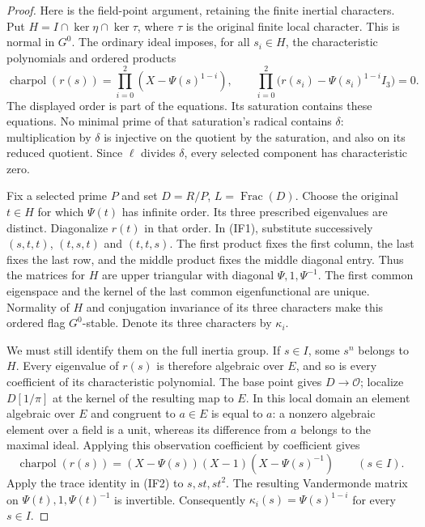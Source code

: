 \begin{proof}
Here is the field-point argument, retaining the finite inertial
characters.  Put $H=I\cap\ker\eta\cap\ker\tau$, where $\tau$ is the
original finite local character.  This is normal in $G^0$.  The ordinary
ideal imposes, for all $s_i\in H$, the characteristic polynomials and
ordered products
\[
 \operatorname{charpol}(r(s))=
       \prod_{i=0}^2(X-\Psi(s)^{1-i}),\qquad
 \prod_{i=0}^2\bigl(r(s_i)-\Psi(s_i)^{1-i}I_3\bigr)=0.
                                                               \tag{IF1}
\]
The displayed order is part of the equations.  Its saturation contains
these equations.  No minimal prime of that saturation's radical
contains $\delta$: multiplication by $\delta$ is injective on the
quotient by the saturation, and also on its reduced quotient.
Since $\ell$ divides $\delta$, every selected component has
characteristic zero.

Fix a selected prime $P$ and set $D=R/P$, $L=\operatorname{Frac}(D)$.
Choose the original $t\in H$ for which $\Psi(t)$ has infinite order.
Its three prescribed eigenvalues are distinct.  Diagonalize $r(t)$ in
that order.  In (IF1), substitute successively $(s,t,t)$, $(t,s,t)$ and
$(t,t,s)$.  The first product fixes the first column, the last fixes
the last row, and the middle product fixes the middle diagonal entry.
Thus the matrices for $H$ are upper triangular with diagonal
$\Psi,1,\Psi^{-1}$.  The first common eigenspace and the kernel of the
last common eigenfunctional are unique.  Normality of $H$ and
conjugation invariance of its three characters make this ordered flag
$G^0$-stable.  Denote its three characters by $\kappa_i$.

We must still identify them on the full inertia group.  If $s\in I$,
some $s^n$ belongs to $H$.  Every eigenvalue of $r(s)$ is therefore
algebraic over $E$, and so is every coefficient of its characteristic
polynomial.  The base point gives $D\to\mathcal O$; localize
$D[1/\pi]$ at the kernel of the resulting map to $E$.  In this local
domain an element algebraic over $E$ and congruent to $a\in E$ is
equal to $a$: a nonzero algebraic element over a field is a unit,
whereas its difference from $a$ belongs to the maximal ideal.
Applying this observation coefficient by coefficient gives
\[
 \operatorname{charpol}(r(s))=
          (X-\Psi(s))(X-1)(X-\Psi(s)^{-1})\qquad(s\in I).
                                                               \tag{IF2}
\]
Apply the trace identity in (IF2) to $s,st,st^2$.  The resulting
Vandermonde matrix on $\Psi(t),1,\Psi(t)^{-1}$ is invertible.
Consequently $\kappa_i(s)=\Psi(s)^{1-i}$ for every $s\in I$.


\end{proof}
